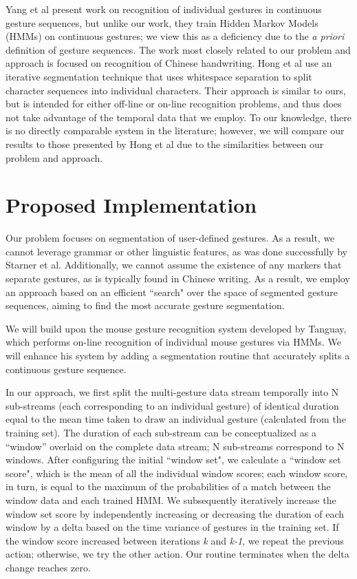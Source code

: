 \documentclass[twoside]{article}
\begin{document}
\begin{multicols}{2}
Yang et al \cite{yang_gesture_1994} present work on recognition of individual
gestures in continuous gesture sequences, but unlike our work, they train Hidden Markov Models (HMMs)
on continuous gestures; we view this as a deficiency due to the \emph{a priori}
definition of gesture sequences. The work most closely
related to our problem and approach is focused on recognition of Chinese
handwriting\cite{hong1998segmentation}. Hong et al use an iterative
segmentation technique that uses whitespace separation to split character
sequences into individual characters. Their approach is similar to ours, but is
intended for either off-line or on-line recognition problems, and thus does not
take advantage of the temporal data that we employ. To our knowledge, there is
no directly comparable system in the literature; however, we will compare our
results to those presented by Hong et al\cite{hong1998segmentation} due to the
similarities between our problem and approach.

\section{Proposed Implementation}

Our problem focuses on segmentation of user-defined gestures. As a result, we
cannot leverage grammar or other linguistic features, as was done successfully
by Starner et al\cite{starner1994line}. Additionally, we cannot
assume the existence of any markers that separate gestures, as is typically found in Chinese
writing\cite{hong1998segmentation}. As a result, we employ an approach based on
an efficient ``search" over the space of segmented gesture sequences, aiming to
find the most accurate gesture segmentation.

We will build upon the mouse gesture recognition system developed by
Tanguay\cite{tanguay_jr_hidden_1995}, which performs on-line recognition of
individual mouse gestures via HMMs. We will enhance his system by adding a segmentation
routine that accurately splits a continuous gesture sequence.

In our approach, we first split the multi-gesture data stream temporally into N
sub-streams (each corresponding to an individual gesture) of identical duration
equal to the mean time taken to draw an individual gesture (calculated from the
training set). The duration of each sub-stream can be conceptualized as a
``window'' overlaid on the complete data stream; N sub-streams correspond to N
windows. After configuring the initial ``window set", we calculate a ``window
set score", which is the mean of all the individual window scores; each window
score, in turn, is equal to the maximum of the probabilities of a match between
the window data and each trained HMM. We subsequently iteratively increase the
window set score by independently increasing or decreasing the duration of each
window by a delta based on the time variance of gestures in the training set. If
the window score increased between iterations \emph{k} and \emph{k-1}, we repeat
the previous action; otherwise, we try the other action. Our routine terminates
when the delta change reaches zero.


\end{multicols}
\end{document}
